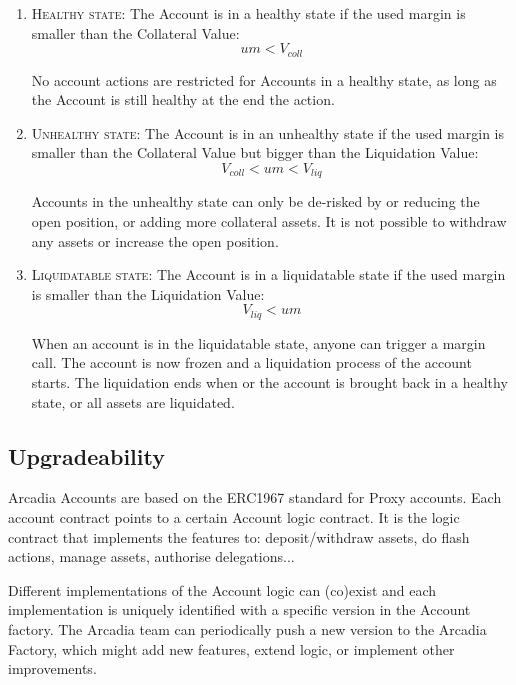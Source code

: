 \documentclass[sigconf,nonacm]{acmart}
\begin{document}
\begin{enumerate}
    \item \textsc{Healthy state:} The Account is in a healthy state if the used margin is smaller than the Collateral Value:
        \begin{equation}
            um < V_{coll}
        \end{equation}

        No account actions are restricted for Accounts in a healthy state, as long as the Account is still healthy at the end the action.
    \item \textsc{Unhealthy state:} The Account is in an unhealthy state if the used margin is smaller than the Collateral Value but bigger than the Liquidation Value:
        \begin{equation}
            V_{coll} < um < V_{liq}
        \end{equation}
        
        Accounts in the unhealthy state can only be de-risked by or reducing the open position, or adding more collateral assets.
        It is not possible to withdraw any assets or increase the open position.
    \item \textsc{Liquidatable state:} The Account is in a liquidatable state if the used margin is smaller than the Liquidation Value:
        \begin{equation}
            V_{liq} < um
        \end{equation}
        
        When an account is in the liquidatable state, anyone can trigger a margin call.
        The account is now frozen and a liquidation process of the account starts.
        The liquidation ends when or the account is brought back in a healthy state, or all assets are liquidated.
\end{enumerate}

\subsection{Upgradeability}
\label{subsec:upgradeability}
Arcadia Accounts are based on the ERC1967 standard for Proxy accounts.
Each account contract points to a certain Account logic contract.
It is the logic contract that implements the features to: deposit/withdraw assets, do flash actions, manage assets, authorise delegations...

Different implementations of the Account logic can (co)exist and each implementation is uniquely identified with a specific version in the Account factory.
The Arcadia team can periodically push a new version to the Arcadia Factory, which might add new features, extend logic, or implement other improvements.
\end{document}
